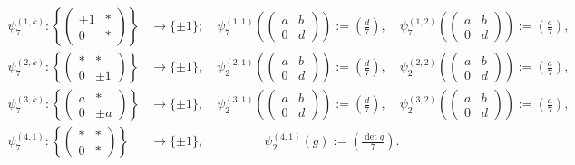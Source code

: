\begin{equation} \label{psifiberingmapsmod7}
\begin{split}
\psi_7^{(1,k)} : \left\{ \begin{pmatrix} \pm 1 & * \\ 0 & * \end{pmatrix} \right\} &\longrightarrow \{ \pm 1 \}; \quad \psi_7^{(1,1)}\left( \begin{pmatrix} a & b \\ 0 & d \end{pmatrix} \right) := \left( \frac{d}{7} \right), \quad \psi_7^{(1,2)}\left( \begin{pmatrix} a & b \\ 0 & d \end{pmatrix} \right) := \left( \frac{a}{7} \right), \\
\psi_7^{(2,k)} : \left\{ \begin{pmatrix} * & * \\ 0 & \pm 1 \end{pmatrix} \right\} &\longrightarrow \{ \pm 1 \}, \quad \psi_2^{(2,1)}\left( \begin{pmatrix} a & b \\ 0 & d \end{pmatrix} \right) := \left( \frac{d}{7} \right), \quad \psi_2^{(2,2)}\left( \begin{pmatrix} a & b \\ 0 & d \end{pmatrix} \right) := \left( \frac{a}{7} \right), \\
\psi_7^{(3,k)} : \left\{ \begin{pmatrix} a & * \\ 0 & \pm a \end{pmatrix} \right\} &\longrightarrow \{ \pm 1 \}, \quad \psi_2^{(3,1)}\left( \begin{pmatrix} a & b \\ 0 & d \end{pmatrix} \right) := \left( \frac{d}{7} \right), \quad \psi_2^{(3,2)}\left( \begin{pmatrix} a & b \\ 0 & d \end{pmatrix} \right) := \left( \frac{a}{7} \right), \\ 
\psi_7^{(4,1)} : \left\{ \begin{pmatrix} * & * \\ 0 & * \end{pmatrix} \right\} &\longrightarrow \{ \pm 1 \}, \quad\quad\quad\quad\;\;\, \psi_2^{(4,1)}\left( g \right) := \left( \frac{\det g}{7} \right).
\end{split}
\end{equation}
